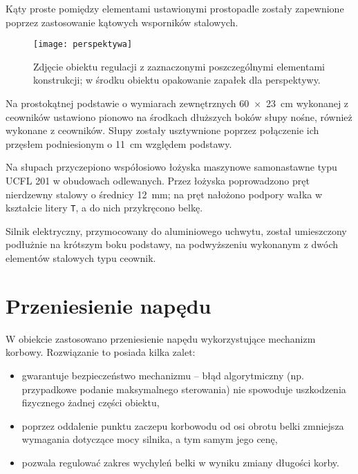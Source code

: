 Kąty proste pomiędzy elementami ustawionymi prostopadle zostały zapewnione poprzez zastosowanie kątowych wsporników stalowych.

\begin{figure}[H]
	\centering
	\texttt{[image: perspektywa]}
	\caption{Zdjęcie obiektu regulacji z zaznaczonymi poszczególnymi elementami konstrukcji; w środku obiektu opakowanie zapałek dla perspektywy.}
	\label{fig:perspektywa}
\end{figure}

Na prostokątnej podstawie o wymiarach zewnętrznych \SI{60 x 23}{cm} wykonanej z ceowników ustawiono pionowo na środkach dłuższych boków słupy nośne, również wykonane z ceowników. Słupy zostały usztywnione poprzez połączenie ich przęsłem podniesionym o \SI{11}{cm} względem podstawy.

Na słupach przyczepiono współosiowo łożyska maszynowe samonastawne typu UCFL 201 w obudowach odlewanych. Przez łożyska poprowadzono pręt nierdzewny stalowy o średnicy \SI{12}{mm}; na pręt nałożono podpory wałka w kształcie litery \texttt{T}, a do nich przykręcono belkę.

Silnik elektryczny, przymocowany do aluminiowego uchwytu, został umieszczony podłużnie na krótszym boku podstawy, na podwyższeniu wykonanym z dwóch elementów stalowych typu ceownik.


\section{Przeniesienie napędu}
\label{sec:ch2_przeniesienie_napedu}

W obiekcie zastosowano przeniesienie napędu wykorzystujące mechanizm korbowy. Rozwiązanie to posiada kilka zalet:

\begin{itemize}
	\item gwarantuje bezpieczeństwo mechanizmu -- błąd algorytmiczny (np. przypadkowe podanie maksymalnego sterowania) nie spowoduje uszkodzenia fizycznego żadnej części obiektu,
	\item poprzez oddalenie punktu zaczepu korbowodu od osi obrotu belki zmniejsza wymagania dotyczące mocy silnika, a tym samym jego cenę,
	\item pozwala regulować zakres wychyleń belki w wyniku zmiany długości korby.
\end{itemize}


